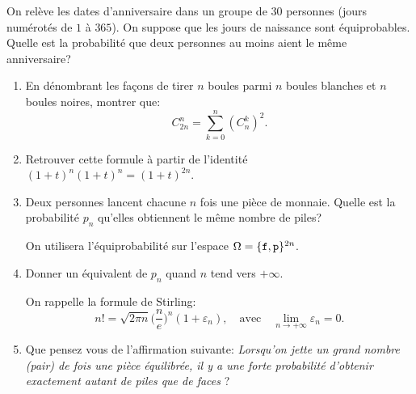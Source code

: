 \documentclass[a4paper,12pt,reqno]{amsart}
\begin{document}
\begin{exo}

  On relève les dates d'anniversaire dans un groupe de $30$ personnes (jours numérotés de $1$ à $365$). On suppose que les jours de naissance sont équiprobables. Quelle est la probabilité que deux personnes au moins aient le même anniversaire?

\end{exo}


\begin{exo}

  \begin{enumerate}
    \item En dénombrant les façons de tirer $n$ boules parmi $n$ boules blanches et $n$ boules noires, montrer que:
      $$
        C_{2n}^n=\sum_{k=0}^n (C_n^k)^2.
      $$

    \item Retrouver cette formule à partir de l'identité $(1+t)^n(1+t)^n=(1+t)^{2n}$.
    \item Deux personnes lancent chacune $n$ fois une pièce de monnaie. Quelle est la probabilité $p_n$ qu'elles obtiennent le même nombre de piles?

    \begin{indication}
      On utilisera l'équiprobabilité sur l'espace $\Omega=\{{\tt f}, {\tt p}\}^{2n}$.
    \end{indication}

    \item Donner un équivalent de $p_n$ quand $n$ tend vers $+\infty$.

    \begin{indication}
      On rappelle la formule de Stirling:
        $$
          n!=\sqrt{2\pi n}\Big(\frac{n}{e}\Big)^{n}(1+\varepsilon_n),\quad\text{avec}\quad \lim_{n\to +\infty} \varepsilon_n=0.
        $$
    \end{indication}\hspace{-\baselineskip}

    \item Que pensez vous de l'affirmation suivante: \emph{Lorsqu'on jette un grand nombre (pair) de fois une pièce équilibrée, il y a une forte probabilité d'obtenir exactement autant de piles que de faces} ?
  \end{enumerate}

\end{exo}
\end{document}
